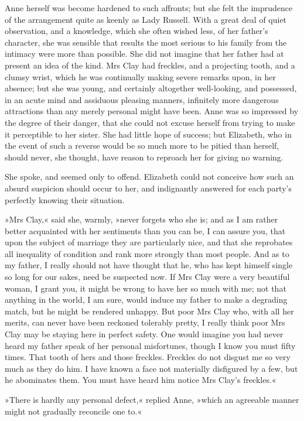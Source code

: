Anne herself was become hardened to such affronts; but she felt the imprudence of the arrangement quite as keenly as Lady Russell. With a great deal of quiet observation, and a knowledge, which she often wished less, of her father's character, she was sensible that results the most serious to his family from the intimacy were more than possible. She did not imagine that her father had at present an idea of the kind. Mrs Clay had freckles, and a projecting tooth, and a clumsy wrist, which he was continually making severe remarks upon, in her absence; but she was young, and certainly altogether well-looking, and possessed, in an acute mind and assiduous pleasing manners, infinitely more dangerous attractions than any merely personal might have been. Anne was so impressed by the degree of their danger, that she could not excuse herself from trying to make it perceptible to her sister. She had little hope of success; but Elizabeth, who in the event of such a reverse would be so much more to be pitied than herself, should never, she thought, have reason to reproach her for giving no warning.

She spoke, and seemed only to offend. Elizabeth could not conceive how such an absurd suspicion should occur to her, and indignantly answered for each party's perfectly knowing their situation.

»Mrs Clay,« said she, warmly, »never forgets who she is; and as I am rather better acquainted with her sentiments than you can be, I can assure you, that upon the subject of marriage they are particularly nice, and that she reprobates all inequality of condition and rank more strongly than most people. And as to my father, I really should not have thought that he, who has kept himself single so long for our sakes, need be suspected now. If Mrs Clay were a very beautiful woman, I grant you, it might be wrong to have her so much with me; not that anything in the world, I am sure, would induce my father to make a degrading match, but he might be rendered unhappy. But poor Mrs Clay who, with all her merits, can never have been reckoned tolerably pretty, I really think poor Mrs Clay may be staying here in perfect safety. One would imagine you had never heard my father speak of her personal misfortunes, though I know you must fifty times. That tooth of hers and those freckles. Freckles do not disgust me so very much as they do him. I have known a face not materially disfigured by a few, but he abominates them. You must have heard him notice Mrs Clay's freckles.«

»There is hardly any personal defect,« replied Anne, »which an agreeable manner might not gradually reconcile one to.«


